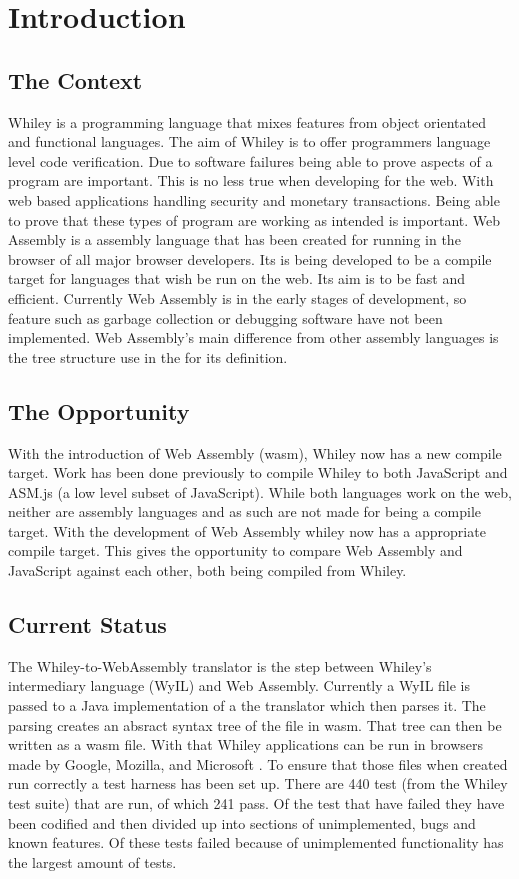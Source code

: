 \chapter{Introduction}\label{C:intro}

\section{The Context}
Whiley is a programming language that mixes features from object orientated and functional languages. The aim of Whiley is to offer programmers language level code verification. Due to software failures being able to prove aspects of a program are important. This is no less true when developing for the web. With web based applications handling security and monetary transactions. Being able to prove that these types of program are working as intended is important. 
Web Assembly is a assembly language that has been created for running in the browser of all major browser developers. Its is being developed to be a compile target for languages that wish be run on the web. Its aim is to be fast and efficient. Currently Web Assembly is in the early stages of development, so feature such as garbage collection or debugging software have not been implemented. Web Assembly's main difference from other assembly languages is the tree structure use in the for its definition. 

\section{The Opportunity}
With the introduction of Web Assembly (wasm), Whiley now has a new compile target. Work has been done previously to compile Whiley to both JavaScript and ASM.js (a low level subset of JavaScript). While both languages work on the web, neither are assembly languages and as such are not made for being a compile target. With the development of Web Assembly whiley now has a appropriate compile target. This gives the opportunity to compare Web Assembly and JavaScript against each other, both being compiled from Whiley.

\section{Current Status}
The Whiley-to-WebAssembly translator is the step between Whiley's intermediary language (WyIL) and Web Assembly. Currently a WyIL file is passed to a Java implementation of a the translator which then parses it. The parsing creates an absract syntax tree of the file in wasm. That tree can then be written as a wasm file. With that Whiley applications can be run in browsers made by Google, Mozilla, and Microsoft \cite{8_wagner_2016}. To ensure that those files when created run correctly a test harness has been set up. There are 440 test (from the Whiley test suite) that are run, of which 241 pass. Of the test that have failed they have been codified and then divided up into sections of unimplemented, bugs and known features. Of these tests failed because of unimplemented functionality has the largest amount of tests. 

